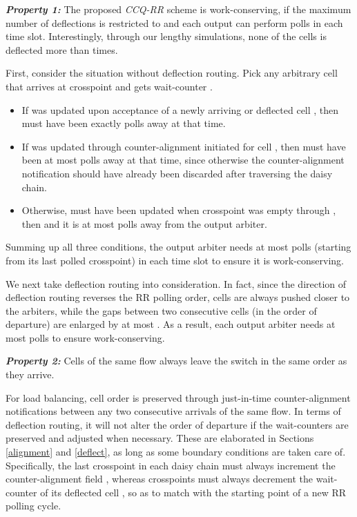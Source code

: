 \documentclass[journal,final,doublecolumn,10pt,twoside]{IEEEtranTCOM} \normalsize
\begin{document}
\textbf{\emph{Property 1:}} The proposed \emph{CCQ-RR} scheme is work-conserving, if the maximum number of deflections is restricted to  and each output can perform  polls in each time slot. Interestingly, through our lengthy simulations, none of the cells is deflected more than  times.

First, consider the situation without deflection routing. Pick any arbitrary cell  that arrives at crosspoint  and gets wait-counter .
\begin{itemize}
\item
If  was updated upon acceptance of a newly arriving or deflected cell , then  must have been exactly  polls away at that time. 

\item 
If  was updated through counter-alignment initiated for cell , then  must have been at most  polls away at that time, since otherwise the counter-alignment notification should have already been discarded after traversing the daisy chain. 

\item
Otherwise,  must have been updated when crosspoint  was empty through , then  and it is at most  polls away from the output arbiter.
\end{itemize}

Summing up all three conditions, the output arbiter needs at most  polls (starting from its last polled crosspoint) in each time slot to ensure it is work-conserving.

We next take deflection routing into consideration. In fact, since the direction of deflection routing reverses the RR polling order, cells are always pushed closer to the arbiters, while the gaps between two consecutive cells (in the order of departure) are enlarged by at most . As a result, each output arbiter needs at most  polls to ensure work-conserving. 


\textbf{\emph{Property 2:}} Cells of the same flow always leave the switch in the same order as they arrive.

For load balancing, cell order is preserved through just-in-time counter-alignment notifications between any two consecutive arrivals of the same flow. In terms of deflection routing, it will not alter the order of departure if the wait-counters are preserved and adjusted when necessary. These are elaborated in Sections \ref{alignment} and \ref{deflect}, as long as some boundary conditions are taken care of. Specifically, the last crosspoint  in each daisy chain  must always increment the counter-alignment field , whereas crosspoints  must always decrement the wait-counter of its deflected cell , so as to match with the starting point of a new RR polling cycle.
\end{document}
